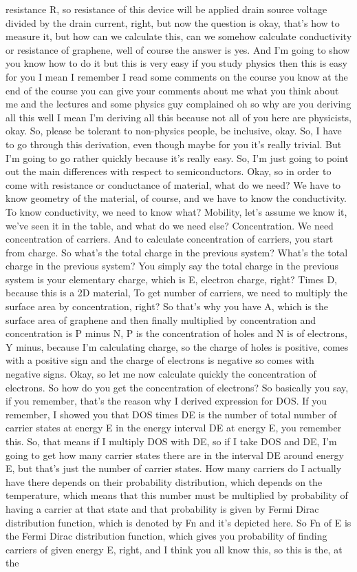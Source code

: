 resistance R, so resistance of this device will be applied drain source voltage divided by the drain current, right, but now the question is okay, that's how to measure it, but how can we calculate this, can we somehow calculate conductivity or resistance of graphene, well of course the answer is yes.
And I'm going to show you know how to do it but this is very easy if you study physics then this is easy for you I mean I remember I read some comments on the course you know at the end of the course you can give your comments about me what you think about me and the lectures and some physics guy complained oh so why are you deriving all this well I mean I'm deriving all this because not all of you here are physicists, okay. So, please be tolerant to non-physics people, be inclusive, okay. So, I have to go through this derivation, even though maybe for you it's really trivial. But I'm going to go rather quickly because it's really easy. So, I'm just going to point out the main differences with respect to semiconductors. Okay, so in order to come with resistance or conductance of material, what do we need? We have to know geometry of the material, of course, and we have to know the conductivity. To know conductivity, we need to know what? Mobility, let's assume we know it, we've seen it in the table, and what do we need else? Concentration. We need concentration of carriers. And to calculate concentration of carriers, you start from charge. So what's the total charge in the previous system? What's the total charge in the previous system? You simply say the total charge in the previous system is your elementary charge, which is E, electron charge, right? Times D, because this is a 2D material, To get number of carriers, we need to multiply the surface area by concentration, right? So that's why you have A, which is the surface area of graphene and then finally multiplied by concentration and concentration is P minus N, P is the concentration of holes and N is of electrons, Y minus, because I'm calculating charge, so the charge of holes is positive, comes with a positive sign and the charge of electrons is negative so comes with negative signs. Okay, so let me now calculate quickly the concentration of electrons. So how do you get the concentration of electrons? So basically you say, if you remember, that's the reason why I derived expression for DOS. If you remember, I showed you that DOS times DE is the number of total number of carrier states at energy E in the energy interval DE at energy E, you remember this. So, that means if I multiply DOS with DE, so if I take DOS and DE, I'm going to get how many carrier states there are in the interval DE around energy E, but that's just the number of carrier states. How many carriers do I actually have there depends on their probability distribution, which depends on the temperature, which means that this number must be multiplied by probability of having a carrier at that state and that probability is given by Fermi Dirac distribution function, which is denoted by Fn and it's depicted here. So Fn of E is the Fermi Dirac distribution function, which gives you probability of finding carriers of given energy E, right, and I think you all know this, so this is the, at the 